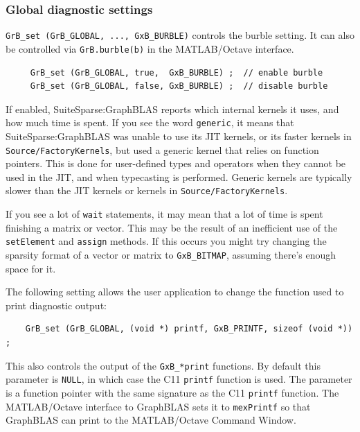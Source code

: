\subsubsection{Global diagnostic settings}
\label{diag}

\verb'GrB_set (GrB_GLOBAL, ..., GxB_BURBLE)' controls the burble setting.  It can also be
controlled via \verb'GrB.burble(b)' in the MATLAB/Octave interface.

{\footnotesize
\begin{verbatim}
     GrB_set (GrB_GLOBAL, true,  GxB_BURBLE) ;  // enable burble
     GrB_set (GrB_GLOBAL, false, GxB_BURBLE) ;  // disable burble \end{verbatim}}

If enabled, SuiteSparse:GraphBLAS reports which internal kernels it uses, and
how much time is spent.  If you see the word \verb'generic', it means that
SuiteSparse:GraphBLAS was unable to use its JIT kernels, or its faster kernels
in \verb'Source/FactoryKernels', but used a generic kernel that relies on
function pointers.  This is done for user-defined types and operators when they
cannot be used in the JIT, and when typecasting is performed.  Generic kernels
are typically slower than the JIT kernels or kernels in
\verb'Source/FactoryKernels'.

If you see a lot of \verb'wait' statements, it may mean that a lot of time is
spent finishing a matrix or vector.  This may be the result of an inefficient
use of the \verb'setElement' and \verb'assign' methods.  If this occurs you
might try changing the sparsity format of a vector or matrix to
\verb'GxB_BITMAP', assuming there's enough space for it.

The following setting allows the user application to change the
function used to print diagnostic output:

{\small
\begin{verbatim}
    GrB_set (GrB_GLOBAL, (void *) printf, GxB_PRINTF, sizeof (void *)) ; \end{verbatim} }

This also controls the output of the
\verb'GxB_*print' functions.  By default this parameter is \verb'NULL', in
which case the C11 \verb'printf' function is used.  The parameter is a
function pointer with the same signature as the C11 \verb'printf'
function.  The MATLAB/Octave interface to GraphBLAS sets it to \verb'mexPrintf'
so that GraphBLAS can print to the MATLAB/Octave Command Window.

